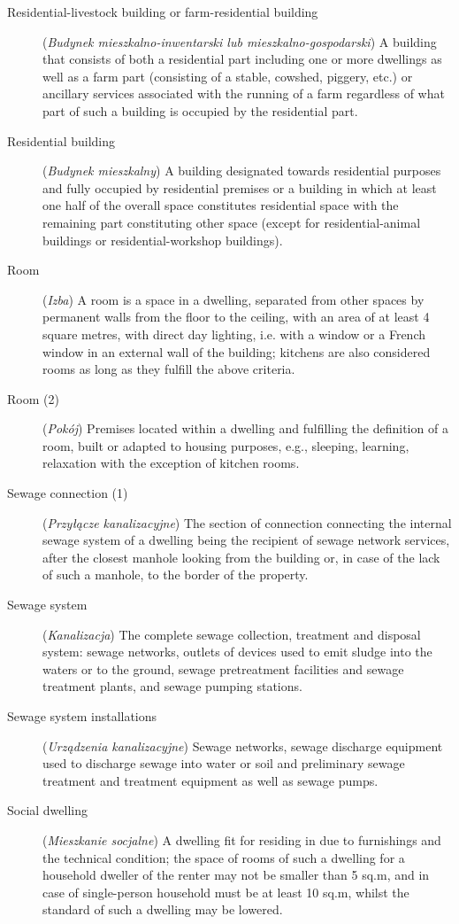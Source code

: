\documentclass[12pt,a4paper]{article}
\begin{document}
\begin{description}
\item[Residential-livestock building or farm-residential building] (\textit{Budynek mieszkalno-inwentarski lub mieszkalno-gospodarski}) A building that consists of both a residential part including one or more dwellings as well as a farm part (consisting of a stable, cowshed, piggery, etc.) or ancillary services associated with the running of a farm regardless of what part of such a building is occupied by the residential part.
\item[Residential building] (\textit{Budynek mieszkalny}) A building designated towards residential purposes and fully occupied by residential premises or a building in which at least one half of the overall space constitutes residential space with the remaining part constituting other space (except for residential-animal buildings or residential-workshop buildings). 
\item[Room] (\textit{Izba}) A room is a space in a dwelling, separated from other spaces by permanent walls from the floor to the ceiling, with an area of at least 4 square metres, with direct day lighting, i.e. with a window or a French window in an external wall of the building; kitchens are also considered rooms as long as they fulfill the above criteria.
\item[Room (2)] (\textit{Pokój}) Premises located within a dwelling and fulfilling the definition of a room, built or adapted to housing purposes, e.g., sleeping, learning, relaxation with the exception of kitchen rooms.
\item[Sewage connection (1)] (\textit{Przyłącze kanalizacyjne}) The section of connection connecting the internal sewage system of a dwelling being the recipient of sewage network services, after the closest manhole looking from the building or, in case of the lack of such a manhole, to the border of the property.
\item[Sewage system] (\textit{Kanalizacja}) The complete sewage collection, treatment and disposal system: sewage networks, outlets of devices used to emit sludge into the waters or to the ground, sewage pretreatment facilities and sewage treatment plants, and sewage pumping stations.
\item[Sewage system installations] (\textit{Urządzenia kanalizacyjne}) Sewage networks, sewage discharge equipment used to discharge sewage into water or soil and preliminary sewage treatment and treatment equipment as well as sewage pumps.
\item[Social dwelling] (\textit{Mieszkanie socjalne}) A dwelling fit for residing in due to furnishings and the technical condition; the space of rooms of such a dwelling for a household dweller of the renter may not be smaller than 5 sq.m, and in case of single-person household must be at least 10 sq.m, whilst the standard of such a dwelling may be lowered.

\end{description}
\end{document}
